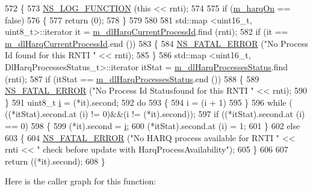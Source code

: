 \begin{DoxyCode}
572 \{
573   \hyperlink{log-macros-disabled_8h_a90b90d5bad1f39cb1b64923ea94c0761}{NS\_LOG\_FUNCTION} (\textcolor{keyword}{this} << rnti);
574 
575   \textcolor{keywordflow}{if} (\hyperlink{classns3_1_1TdBetFfMacScheduler_a8de90c082c621bf8d664fff8cf370acb}{m\_harqOn} == \textcolor{keyword}{false})
576     \{
577       \textcolor{keywordflow}{return} (0);
578     \}
579 
580 
581   std::map <uint16\_t, uint8\_t>::iterator it = \hyperlink{classns3_1_1TdBetFfMacScheduler_ac0ed078aaa3bb69134023425a66ff84a}{m\_dlHarqCurrentProcessId}.find (rnti);
582   \textcolor{keywordflow}{if} (it == \hyperlink{classns3_1_1TdBetFfMacScheduler_ac0ed078aaa3bb69134023425a66ff84a}{m\_dlHarqCurrentProcessId}.end ())
583     \{
584       \hyperlink{group__fatal_ga5131d5e3f75d7d4cbfd706ac456fdc85}{NS\_FATAL\_ERROR} (\textcolor{stringliteral}{"No Process Id found for this RNTI "} << rnti);
585     \}
586   std::map <uint16\_t, DlHarqProcessesStatus\_t>::iterator itStat = 
      \hyperlink{classns3_1_1TdBetFfMacScheduler_af9f2ffd80c6d473a5ccee8fb153d40f6}{m\_dlHarqProcessesStatus}.find (rnti);
587   \textcolor{keywordflow}{if} (itStat == \hyperlink{classns3_1_1TdBetFfMacScheduler_af9f2ffd80c6d473a5ccee8fb153d40f6}{m\_dlHarqProcessesStatus}.end ())
588     \{
589       \hyperlink{group__fatal_ga5131d5e3f75d7d4cbfd706ac456fdc85}{NS\_FATAL\_ERROR} (\textcolor{stringliteral}{"No Process Id Statusfound for this RNTI "} << rnti);
590     \}
591   uint8\_t \hyperlink{bernuolliDistribution_8m_a6f6ccfcf58b31cb6412107d9d5281426}{i} = (*it).second;
592   \textcolor{keywordflow}{do}
593     \{
594       i = (i + 1) %
595     \}
596   \textcolor{keywordflow}{while} ( ((*itStat).second.at (i) != 0)&&(i != (*it).second));
597   \textcolor{keywordflow}{if} ((*itStat).second.at (i) == 0)
598     \{
599       (*it).second = \hyperlink{bernuolliDistribution_8m_a6f6ccfcf58b31cb6412107d9d5281426}{i};
600       (*itStat).second.at (i) = 1;
601     \}
602   \textcolor{keywordflow}{else}
603     \{
604       \hyperlink{group__fatal_ga5131d5e3f75d7d4cbfd706ac456fdc85}{NS\_FATAL\_ERROR} (\textcolor{stringliteral}{"No HARQ process available for RNTI "} << rnti << \textcolor{stringliteral}{" check before update
       with HarqProcessAvailability"});
605     \}
606 
607   \textcolor{keywordflow}{return} ((*it).second);
608 \}
\end{DoxyCode}


Here is the caller graph for this function\+:


